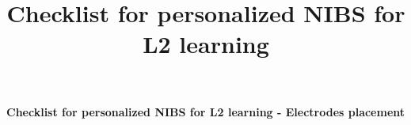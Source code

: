 \documentclass[journal, onecolumn, 11pt]{IEEEtran}
\title{Checklist for personalized NIBS for L2 learning}
\begin{document}
	
	
	
	\begin{center}
		{ \Large  
			\textbf{Checklist for personalized NIBS for L2 learning - Electrodes placement}
		}
	\end{center}
\vspace{1cm}
\end{document}
